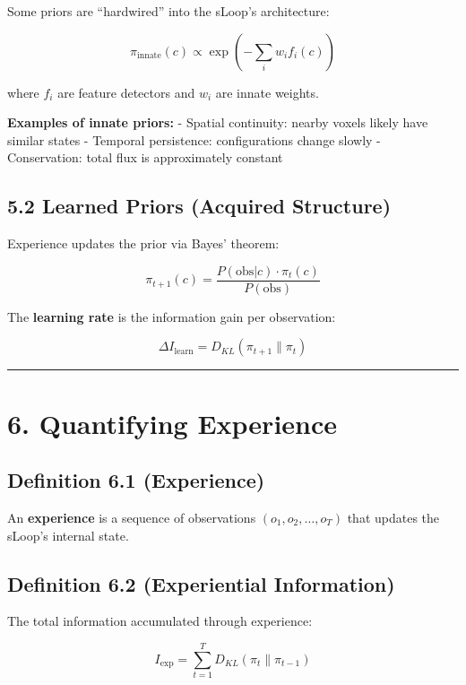 \documentclass[
  11pt,
  letterpaper,
  twoside,
  openany]{book}
\makeatletter
\let\orig@section\section
\renewcommand{\section}{\needspace{8\baselineskip}\orig@section}
\let\orig@subsection\subsection
\renewcommand{\subsection}{\needspace{6\baselineskip}\orig@subsection}
\makeatother
\begin{document}
Some priors are ``hardwired'' into the sLoop's architecture:

\[\pi_{\text{innate}}(c) \propto \exp\left(-\sum_i w_i f_i(c)\right)\]

where \(f_i\) are feature detectors and \(w_i\) are innate weights.

\textbf{Examples of innate priors:} - Spatial continuity: nearby voxels
likely have similar states - Temporal persistence: configurations change
slowly - Conservation: total flux is approximately constant

\subsection{5.2 Learned Priors (Acquired
Structure)}\label{learned-priors-acquired-structure}

Experience updates the prior via Bayes' theorem:

\[\pi_{t+1}(c) = \frac{P(\text{obs}|c) \cdot \pi_t(c)}{P(\text{obs})}\]

The \textbf{learning rate} is the information gain per observation:

\[\Delta I_{\text{learn}} = D_{KL}(\pi_{t+1} \| \pi_t)\]

\begin{center}\rule{0.5\linewidth}{0.5pt}\end{center}

\section{6. Quantifying Experience}\label{quantifying-experience}

\subsection{Definition 6.1
(Experience)}\label{definition-6.1-experience}

An \textbf{experience} is a sequence of observations
\((o_1, o_2, \ldots, o_T)\) that updates the sLoop's internal state.

\subsection{Definition 6.2 (Experiential
Information)}\label{definition-6.2-experiential-information}

The total information accumulated through experience:

\[I_{\text{exp}} = \sum_{t=1}^T D_{KL}(\pi_t \| \pi_{t-1})\]
\end{document}
